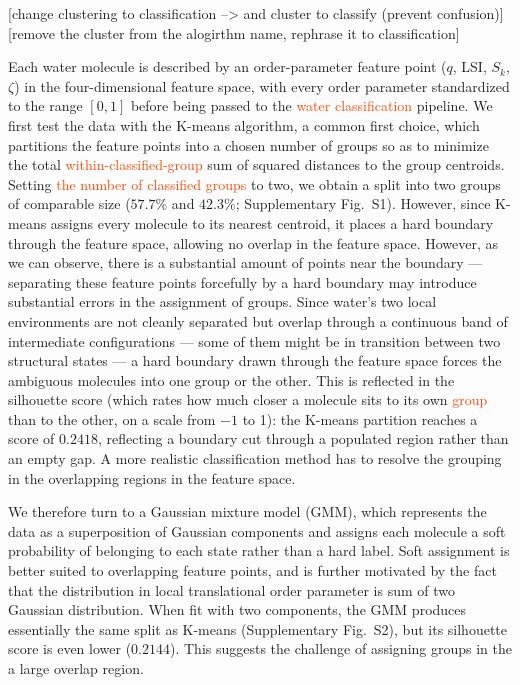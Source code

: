 \documentclass[aps, amsmath,amssymb, reprint, twocolumn, superscriptaddress]{revtex4-2}
\newcommand{\edit}[1]{\textcolor{OrangeRed}{#1}}
\begin{document}
[change clustering to classification --> and cluster to classify (prevent confusion)]
[remove the cluster from the alogirthm name, rephrase it to classification]

Each water molecule is described by an order-parameter feature point ($q$, LSI, $S_k$, $\zeta$) in the four-dimensional feature space, with every order parameter standardized to the range $[0,1]$ before being passed to the \edit{water classification} pipeline. We first test the data with the K-means algorithm\cite{lloyd_least_1982,macqueen_methods_1967,ikotun_k-means_2023}, a common first choice, which partitions the feature points into a chosen number of groups so as to minimize the total \edit{within-classified-group} sum of squared distances to the group centroids. Setting \edit{the number of classified groups} to two, we obtain a split into two groups of comparable size ($57.7\%$ and $42.3\%$; Supplementary Fig.~S1). However, since K-means assigns every molecule to its nearest centroid, it places a hard boundary through the feature space, allowing no overlap in the feature space. However, as we can observe, there is a substantial amount of points near the boundary ---  separating these feature points forcefully by a hard boundary may introduce substantial errors in the assignment of groups. Since water's two local environments are not cleanly separated but overlap through a continuous band of intermediate configurations --- some of them might be in transition between two structural states --- a hard boundary drawn through the feature space forces the ambiguous molecules into one group or the other. This is reflected in the silhouette score\cite{rousseeuw_silhouettes_1987} (which rates how much closer a molecule sits to its own \edit{group} than to the other, on a scale from $-1$ to 1): the K-means partition reaches a score of $0.2418$, reflecting a boundary cut through a populated region rather than an empty gap. A more realistic classification method has to resolve the grouping in  the overlapping regions in the feature space.  

We therefore turn to a Gaussian mixture model (GMM), which represents the data as a superposition of Gaussian components and assigns each molecule a soft probability of belonging to each state rather than a hard label\cite{deprez-2024,dempster_maximum_1977}. Soft assignment is better suited to overlapping feature points, and is further motivated by the fact that the distribution in local translational order parameter is sum of two Gaussian distribution\cite{shi_direct_2020}. When fit with two components, the GMM produces essentially the same split as K-means (Supplementary Fig.~S2), but its silhouette score is even lower ($0.2144$). This suggests the challenge of assigning groups in the a large overlap region. 
\end{document}
